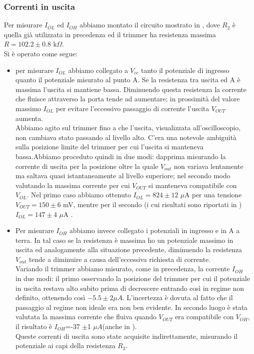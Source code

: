 \subsubsection{Correnti in uscita}
Per misurare $I_{OL}$ ed $I_{OH}$ abbiamo montato il circuito mostrato in , dove $R_2$ è quella già utilizzata in precedenza ed il trimmer ha resistenza massima $R = 102.2 \pm 0.8$ k$\Omega$.\\
Si è operato come segue:
\begin{itemize}
\item per misurare $I_{OL}$ abbiamo collegato a $V_{cc}$ tanto il potenziale di ingresso quanto il potenziale misurato al punto A. 
Se la resistenza tra uscita ed A è massima l'uscita si mantiene bassa. Diminuendo questa resistenza la corrente che fluisce attraverso la porta tende ad aumentare; in prossimità del valore massimo $I_{OL}$ per evitare l'eccessivo passaggio di corrente l'uscita $V_{OUT}$ aumenta.\\
 Abbiamo agito sul trimmer fino a che l'uscita, visualizzata all'oscilloscopio, non cambiava stato passando al livello alto. C'era una notevole ambiguità sulla posizione limite del trimmer per cui l'uscita si manteneva bassa.Abbiamo proceduto quindi in due modi: dapprima misurando la corrente di uscita per la posizione oltre la quale $V_{out}$ non variava lentamente ma saltava quasi istantaneamente al livello superiore; nel secondo modo valutando la massima corrente per cui $V_{OUT}$ si manteneva compatibile con $V_{OL}$. Nel primo caso abbiamo ottenuto $I_{OL} = 824 \pm 12$ $\mu$A per una tensione $V_{OUT}=150 \pm 6$ mV, mentre per il secondo (i cui risultati sono riportati in ) $I_{OL} = 147 \pm 4$ $\mu$A .
\item Per misurare $I_{OH}$ abbiamo invece collegato i potenziali in ingresso e in A a terra. In tal caso se la resistenza è massima ho un potenziale massimo in uscita ed analogamente alla situazione precedente, diminuendo la resistenza  $V_{out}$ tende a diminuire a causa dell'eccessiva richiesta di corrente. \\
Variando il trimmer abbiamo misurato, come in precedenza, la corrente $I_{OH}$ in due modi: il primo osservando la posizione del trimmer per cui il potenziale in uscita restava alto subito prima di decrescere entrando così in regime non definito, ottenendo così $-5.5\pm 2 \mu A$. L'incertezza è dovuta al fatto che il passaggio al regime non ideale era non ben evidente. In secondo luogo è stata valutata la massima corrente che fluiva quando $V_{OUT}$ era compatibile con $V_{OH}$, il risultato è  $I_{OH}$=-37 $\pm$1 $\mu A$(anche in  ).\\
Queste correnti di uscita sono state acquisite indirettamente, misurando il potenziale ai capi della resistenza $R_{2}$.
\end{itemize}
